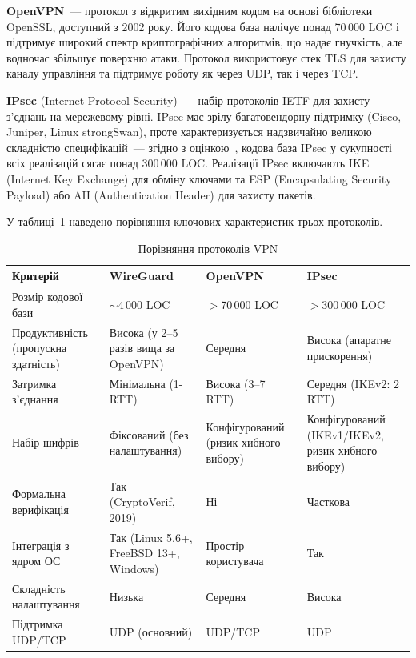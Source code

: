 \textbf{OpenVPN}~--- протокол з відкритим вихідним кодом на основі бібліотеки
OpenSSL, доступний з 2002 року. Його кодова база
налічує понад 70\,000 LOC і підтримує широкий спектр криптографічних
алгоритмів, що надає гнучкість, але водночас збільшує поверхню атаки.
Протокол використовує стек TLS для захисту каналу управління та підтримує
роботу як через UDP, так і через TCP.

\textbf{IPsec} (Internet Protocol Security)~--- набір протоколів IETF для
захисту з'єднань на мережевому рівні. IPsec має зрілу багатовендорну підтримку
(Cisco, Juniper, Linux strongSwan), проте характеризується надзвичайно великою складністю
специфікацій~--- згідно з оцінкою~\cite{donenfeld2017wireguard}, кодова база IPsec у сукупності всіх реалізацій сягає понад 300\,000 LOC.
Реалізації IPsec включають IKE (Internet Key Exchange) для обміну ключами
та ESP (Encapsulating Security Payload) або AH (Authentication Header) для
захисту пакетів.

У таблиці~\ref{tab:vpn_comparison} наведено порівняння ключових характеристик
трьох протоколів.

\begin{table}[htbp]
\caption{Порівняння протоколів VPN}
\label{tab:vpn_comparison}
\small
\begin{tabularx}{\textwidth}{|p{4cm}|X|X|X|}
\hline
\textbf{Критерій} & \textbf{WireGuard} & \textbf{OpenVPN} & \textbf{IPsec} \\
\hline
Розмір кодової бази & $\sim$4\,000 LOC & $>$70\,000 LOC & $>$300\,000 LOC \\
\hline
Продуктивність (пропускна здатність) & Висока (у 2--5 разів вища за OpenVPN) & Середня & Висока (апаратне прискорення) \\
\hline
Затримка з'єднання & Мінімальна (1-RTT) & Висока (3--7 RTT) & Середня (IKEv2: 2 RTT) \\
\hline
Набір шифрів & Фіксований (без налаштування) & Конфігурований (ризик хибного вибору) & Конфігурований (IKEv1/IKEv2, ризик хибного вибору) \\
\hline
Формальна верифікація & Так (CryptoVerif, 2019)~\cite{lipp2019cryptographic} & Ні & Часткова \\
\hline
Інтеграція з ядром ОС & Так (Linux 5.6+, FreeBSD 13+, Windows) & Простір користувача & Так \\
\hline
Складність налаштування & Низька & Середня & Висока \\
\hline
Підтримка UDP/TCP & UDP (основний) & UDP/TCP & UDP \\
\hline
\end{tabularx}
\end{table}


